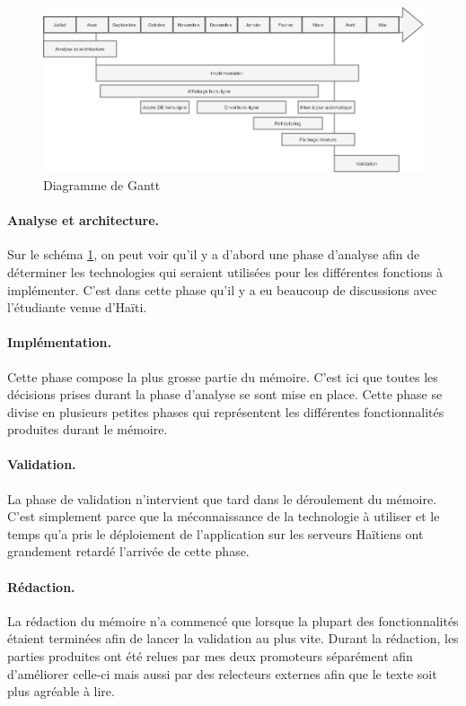 \documentclass{EPL-master-thesis-covers-FR}
\begin{document}
			\begin{figure}[H]
					\centering
					\includegraphics[width=1\textwidth]{images/Gantt}
					\caption{Diagramme de Gantt}
					\label{fig:Gantt}
				\end{figure}
				
			\paragraph*{Analyse et architecture.}
			Sur le schéma \ref{fig:Gantt}, on peut voir qu'il y a d'abord une phase d'analyse afin de déterminer les technologies qui seraient utilisées pour les différentes fonctions à implémenter. C'est dans cette phase qu'il y a eu beaucoup de discussions avec l'étudiante venue d'Haïti.
		
			\paragraph*{Implémentation.} 
			Cette phase compose la plus grosse partie du mémoire. C'est ici que toutes les décisions prises durant la phase d'analyse se sont mise en place. Cette phase se divise en plusieurs petites phases qui représentent les différentes fonctionnalités produites durant le mémoire. 
			
			\paragraph*{Validation.}
			La phase de validation n'intervient que tard dans le déroulement du mémoire. C'est simplement parce que la méconnaissance de la technologie à utiliser et le temps qu'a pris le déploiement de l'application sur les serveurs Haïtiens ont grandement retardé l'arrivée de cette phase.			
			
			\paragraph*{Rédaction.}
			La rédaction du mémoire n'a commencé que lorsque la plupart des fonctionnalités étaient terminées afin de lancer la validation au plus vite. Durant la rédaction, les parties produites ont été relues par mes deux promoteurs séparément afin d'améliorer celle-ci mais aussi par des relecteurs externes afin que le texte soit plus agréable à lire. 
			
\end{document}
